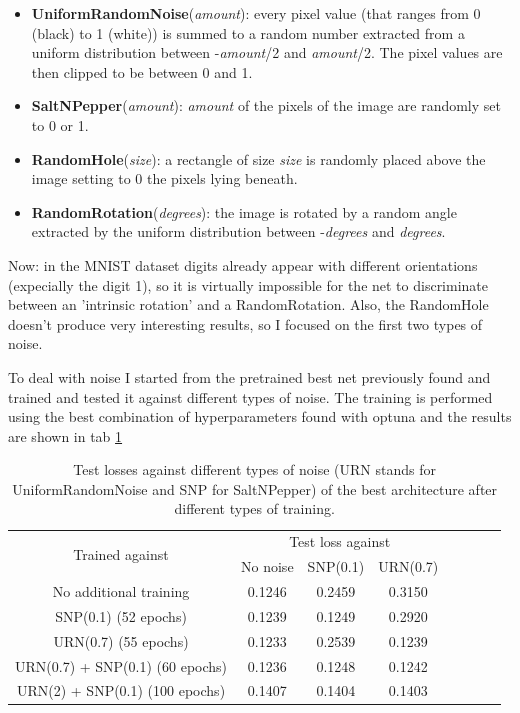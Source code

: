 \documentclass[a4paper, 11pt]{article}
\begin{document}
    \begin{itemize}
      \item \textbf{UniformRandomNoise}(\emph{amount}): every pixel value (that ranges from 0 (black) to 1 (white)) is summed to a random number extracted from a uniform distribution between -\emph{amount}/2 and \emph{amount}/2. The pixel values are then clipped to be between 0 and 1.
      \item \textbf{SaltNPepper}(\emph{amount}): \emph{amount} of the pixels of the image are randomly set to 0 or 1.
      \item \textbf{RandomHole}(\emph{size}): a rectangle of size \emph{size} is randomly placed above the image setting to 0 the pixels lying beneath.
      \item \textbf{RandomRotation}(\emph{degrees}): the image is rotated by a random angle extracted by the uniform distribution between -\emph{degrees} and \emph{degrees}.
    \end{itemize}

    Now: in the MNIST dataset digits already appear with different orientations (expecially the digit 1), so it is virtually impossible for the net to discriminate between an 'intrinsic rotation' and a RandomRotation. Also, the RandomHole doesn't produce very interesting results, so I focused on the first two types of noise.

    To deal with noise I started from the pretrained best net previously found and trained and tested it against different types of noise. The training is performed using the best combination of hyperparameters found with optuna and the results are shown in tab \ref{tab:denoising_loss}

    \begin{table}[H]
      \centering
      \begin{tabular}{c|ccccccc}
        \multirow{2}{*}{Trained against} & \multicolumn{3}{c}{Test loss against} \\
          & No noise & SNP(0.1) & URN(0.7) \\
        \midrule
        No additional training & 0.1246 & 0.2459 & 0.3150 \\
        SNP(0.1) (52 epochs) & 0.1239 & 0.1249 & 0.2920 \\
        URN(0.7) (55 epochs) & 0.1233 & 0.2539 & 0.1239 \\
        URN(0.7) + SNP(0.1) (60 epochs) & 0.1236 & 0.1248 & 0.1242 \\
        URN(2) + SNP(0.1) (100 epochs) & 0.1407 & 0.1404 & 0.1403 \\
        \bottomrule

      \end{tabular}
      \caption{Test losses against different types of noise (URN stands for UniformRandomNoise and SNP for SaltNPepper) of the best architecture after different types of training.}
      \label{tab:denoising_loss}
    \end{table}
\end{document}
